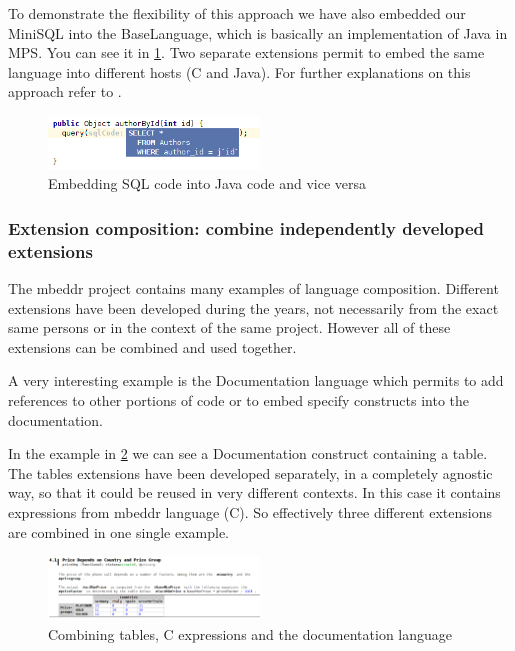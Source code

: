 \documentclass[preprint,numbers,10pt]{sigplanconf}
\begin{document}
To demonstrate the flexibility of this approach we have also embedded our MiniSQL into the BaseLanguage, which is basically an implementation of Java in MPS. You can see it in \ref{fig:sqlembeddingjava}. Two separate extensions permit to embed the same language into different hosts (C and Java). For further explanations on this approach refer to \cite{Tomassetti2013}.

\begin{figure}[H]
	\centering
	\includegraphics[width=0.50\textwidth]{screens/minisql_embedded_java.png}
	\caption{Embedding SQL code into Java code and vice versa}
	\label{fig:sqlembeddingjava}
\end{figure}

\subsubsection{Extension composition: combine independently developed extensions}
\label{evr:langcomp}

The mbeddr project contains many examples of language composition. Different extensions have been developed during the years, not necessarily from the exact same persons or in the context of the same project. However all of these extensions can be combined and used together.

A very interesting example is the Documentation language which permits to add references to other portions of code or to embed specify constructs into the documentation.

In the example in \ref{fig:extensioncomposition} we can see a Documentation construct containing a table. The tables extensions have been developed separately, in a completely agnostic way, so that it could be reused in very different contexts. In this case it contains expressions from mbeddr language (C). So effectively three different extensions are combined in one single example.

\begin{figure}[H]
	\centering
	\includegraphics[width=0.50\textwidth]{screens/extension_composition.png}
	\caption{Combining tables, C expressions and the documentation language}
	\label{fig:extensioncomposition}
\end{figure}
\end{document}
